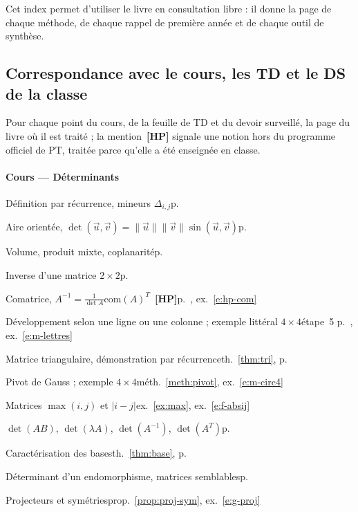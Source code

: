 \documentclass[a4paper,11pt]{article}
\numberwithin{equation}{section}
\numberwithin{figure}{section}
\numberwithin{table}{section}
\theoremstyle{enonce}
\theoremstyle{exemple}
\theoremstyle{remarque}
\newcommand{\ve}[1]{\vec{#1}}
\newcommand{\HP}{\,{\sffamily\bfseries\scriptsize\textcolor{Brique}{[HP]}}}
\begin{document}
Cet index permet d'utiliser le livre en consultation libre : il donne la page de chaque méthode, de chaque rappel de
première année et de chaque outil de synthèse.

\subsection*{Correspondance avec le cours, les TD et le DS de la classe}\label{sec:corresp}
Pour chaque point du cours, de la feuille de TD et du devoir surveillé, la page du livre où il est traité ; la mention
\HP{} signale une notion hors du programme officiel de PT, traitée parce qu'elle a été enseignée en classe.

{\small
\paragraph{Cours --- Déterminants}
\noindent Définition par récurrence, mineurs $\Delta_{i,j}$\dotfill p.~\pageref{thm:def}\par
\noindent Aire orientée, $\det(\ve u,\ve v)=\|\ve u\|\|\ve v\|\sin(\ve u,\ve v)$\dotfill p.~\pageref{fig:aire2}\par
\noindent Volume, produit mixte, coplanarité\dotfill p.~\pageref{fig:volume}\par
\noindent Inverse d'une matrice $2\times2$\dotfill p.~\pageref{hp:comatrice}\par
\noindent Comatrice, $A^{-1}=\frac1{\det A}\mathrm{com}(A)^T$ \HP\dotfill p.~\pageref{hp:comatrice}, ex.~\ref{e:hp-com}\par
\noindent Développement selon une ligne ou une colonne ; exemple littéral $4\times4$\dotfill étape~5 p.~\pageref{etape:5}, ex.~\ref{e:m-lettres}\par
\noindent Matrice triangulaire, démonstration par récurrence\dotfill th.~\ref{thm:tri}, p.~\pageref{thm:tri}\par
\noindent Pivot de Gauss ; exemple $4\times4$\dotfill méth.~\ref{meth:pivot}, ex.~\ref{e:m-circ4}\par
\noindent Matrices $\max(i,j)$ et $|i-j|$\dotfill ex.~\ref{ex:max}, ex.~\ref{e:f-absij}\par
\noindent $\det(AB)$, $\det(\lambda A)$, $\det(A^{-1})$, $\det(A^T)$\dotfill p.~\pageref{thm:fond}\par
\noindent Caractérisation des bases\dotfill th.~\ref{thm:base}, p.~\pageref{thm:base}\par
\noindent Déterminant d'un endomorphisme, matrices semblables\dotfill p.~\pageref{fig:endo}\par
\noindent Projecteurs et symétries\dotfill prop.~\ref{prop:proj-sym}, ex.~\ref{e:g-proj}\par
}
\end{document}
